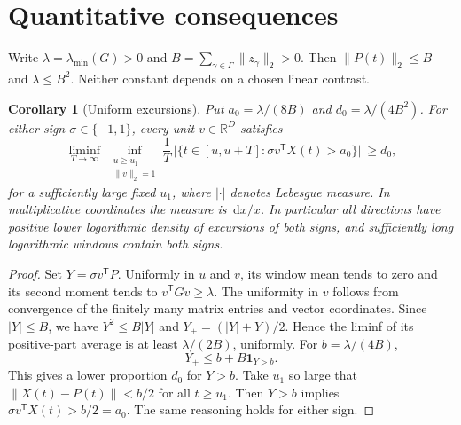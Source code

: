 \documentclass[11pt]{article}
\newtheorem{corollary}[theorem]{Corollary}
\theoremstyle{remark}\newtheorem{remark}[theorem]{Remark}
\newcommand{\R}{\mathbb R}
\newcommand{\dd}{\,\mathrm d}
\newcommand{\ind}{\mathbf 1}
\begin{document}
\section{Quantitative consequences}
Write $\lambda=\lambda_{\min}(G)>0$ and $B=\sum_{\gamma\in\Gamma}\|z_\gamma\|_2>0$. Then $\|P(t)\|_2\le B$ and $\lambda\le B^2$. Neither constant depends on a chosen linear contrast.

\begin{corollary}[Uniform excursions]\label{cor:excursions}
Put $a_0=\lambda/(8B)$ and $d_0=\lambda/(4B^2)$. For either sign $\sigma\in\{-1,1\}$, every unit $v\in\R^D$ satisfies
\[
 \liminf_{T\to\infty}\ \inf_{\substack{u\ge u_1\\\|v\|_2=1}}
 \frac{1}{T}\,\bigl|\{t\in[u,u+T]:\sigma v^{\mathsf T}X(t)>a_0\}\bigr|\ \ge d_0,
\]
for a sufficiently large fixed $u_1$, where $|\cdot|$ denotes Lebesgue measure. In multiplicative coordinates the measure is $\dd x/x$. In particular all directions have positive lower logarithmic density of excursions of both signs, and sufficiently long logarithmic windows contain both signs.
\end{corollary}
\begin{proof}
Set $Y=\sigma v^{\mathsf T}P$. Uniformly in $u$ and $v$, its window mean tends to zero and its second moment tends to $v^{\mathsf T}Gv\ge\lambda$. The uniformity in $v$ follows from convergence of the finitely many matrix entries and vector coordinates. Since $|Y|\le B$, we have $Y^2\le B|Y|$ and $Y_+=(|Y|+Y)/2$. Hence the liminf of its positive-part average is at least $\lambda/(2B)$, uniformly. For $b=\lambda/(4B)$,
\[
 Y_+\le b+B\ind_{Y>b}.
\]
This gives a lower proportion $d_0$ for $Y>b$. Take $u_1$ so large that $\|X(t)-P(t)\|<b/2$ for all $t\ge u_1$. Then $Y>b$ implies $\sigma v^{\mathsf T}X(t)>b/2=a_0$. The same reasoning holds for either sign.
\end{proof}
\end{document}
